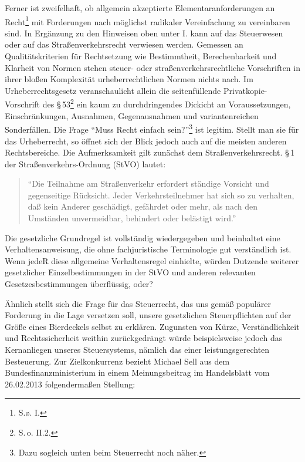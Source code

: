 \documentclass[output=paper]{langscibook}
\begin{document}
Ferner ist zweifelhaft, ob allgemein akzeptierte Elementaranforderungen
an Recht\footnote{S.\o. I.} mit Forderungen nach möglichst radikaler
Vereinfachung zu vereinbaren sind. In Ergänzung zu den Hinweisen oben
unter I. kann auf das Steuerwesen oder auf das Straßenverkehrsrecht
verwiesen werden. Gemessen an Qualitätskriterien für Rechtsetzung wie
Bestimmtheit, Berechenbarkeit und Klarheit von Normen stehen steuer-
oder straßenverkehrsrechtliche Vorschriften in ihrer bloßen Komplexität
urheberrechtlichen Normen nichts nach. Im Urheberrechtsgesetz
veranschaulicht allein die seitenfüllende Privatkopie-Vorschrift des §\,53\footnote{S.\,o. II.2.} ein kaum zu durchdringendes Dickicht an
Voraussetzungen, Einschränkungen, Ausnahmen, Gegenausnahmen und
variantenreichen Sonderfällen. Die Frage \enquote{Muss Recht einfach
sein?}\footnote{Dazu sogleich unten beim Steuerrecht noch näher.} ist
legitim. Stellt man sie für das Urheberrecht, so öffnet sich der Blick
jedoch auch auf die meisten anderen Rechtsbereiche. Die Aufmerksamkeit
gilt zunächst dem Straßenverkehrsrecht. §\,1 der Straßenverkehrs-Ordnung
(StVO) lautet:

\begin{quote}
\enquote{Die Teilnahme am Straßenverkehr erfordert ständige Vorsicht und
gegenseitige Rücksicht. Jeder Verkehrsteilnehmer hat sich so zu
verhalten, daß kein Anderer geschädigt, gefährdet oder mehr, als nach
den Umständen unvermeidbar, behindert oder belästigt wird.}
\end{quote}

Die gesetzliche Grundregel ist vollständig wiedergegeben und beinhaltet
eine Verhaltensanweisung, die ohne fachjuristische Terminologie gut
verständlich ist. Wenn jedeR diese allgemeine Verhaltensregel einhielte,
würden Dutzende weiterer gesetzlicher Einzelbestimmungen in der StVO und
anderen relevanten Gesetzesbestimmungen überflüssig, oder?

Ähnlich stellt sich die Frage für das Steuerrecht, das uns gemäß
populärer Forderung in die Lage versetzen soll, unsere gesetzlichen
Steuerpflichten auf der Größe eines Bierdeckels selbst zu erklären.
Zugunsten von Kürze, Verständlichkeit und Rechtssicherheit weithin
zurückgedrängt würde beispielsweise jedoch das Kernanliegen unseres
Steuersystems, nämlich das einer leistungsgerechten Besteuerung. Zur
Zielkonkurrenz bezieht Michael Sell aus dem Bundesfinanzministerium in
einem Meinungsbeitrag im Handelsblatt vom 26.02.2013 folgendermaßen
Stellung:
\end{document}

